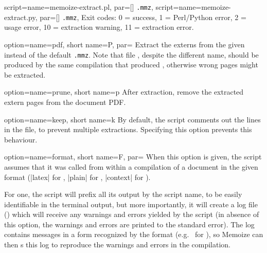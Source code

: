 \documentclass[a4paper,11pt]{article}
\begin{document}
\begin{doc}{
    script={name=memoize-extract.pl, par=[] \texttt{.mmz}},
    script={name=memoize-extract.py, par=[] \texttt{.mmz}},
  }
  Exit codes: 0 = success, 1 = Perl/Python error, 2 = usage error, 10 =
  extraction warning, 11 = extraction error.
  
  \begin{doc}{
      option={name=pdf, short name=P, par=}
    }
    Extract the externs from the given  instead of the default
    \texttt{.mmz}.  Note that file , despite the different
    name, should be produced by the same compilation that produced
    \dmmz, otherwise wrong pages might be extracted.
  \end{doc}
  \begin{doc}{
      option={name=prune, short name=p}
    }
    After extraction, remove the extracted extern pages from the document PDF.
  \end{doc}
  \begin{doc}{
      option={name=keep, short name=k}
    }
    By default, the script comments out the  lines in the
    \dmmz file, to prevent multiple extractions.  Specifying this option
    prevents this behaviour.
  \end{doc}
  \begin{doc}{
      option={name=format, short name=F,
        par=\Alt{}\Alt{}}
    }
    When this option is given, the script assumes that it was called from
    within a  compilation of a document in the given format
    (|latex| for , |plain| for , |context| for
    ).
    
    For one, the script will prefix all its output by the script name, to be
    easily identifiable in the terminal output, but more importantly, it will
    create a log file () which will receive any
    warnings and errors yielded by the script (in absence of this option, the
    warnings and errors are printed to the standard error).  The log contains
    messages in a form recognized by the format (e.g.\  for
    ), so Memoize can then s this log to reproduce the
    warnings and errors in the compilation.


\end{doc}
\end{doc}
\end{document}
